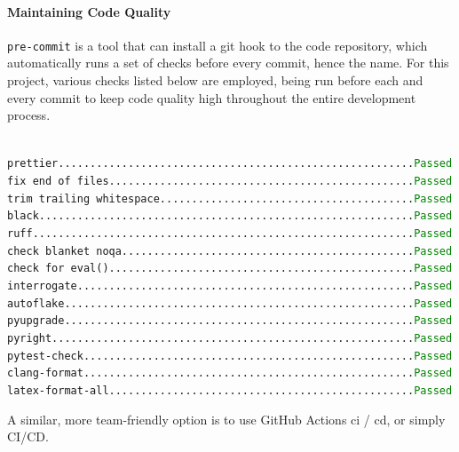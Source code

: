 \documentclass{prettytex/ox/mmsc-special-topic}
\begin{document}
  \paragraph{Maintaining Code Quality}
  \texttt{pre-commit} is a tool that can install a git hook to the code repository, which automatically runs a set of checks before every commit, hence the name.
  For this project, various checks listed below are employed, being run before each and every commit to keep code quality high throughout the entire development process.

  \texttt{
    \hspace*{-1em} prettier........................................................\textcolor{green}{Passed} \\
    fix end of files................................................\textcolor{green}{Passed} \\
    trim trailing whitespace........................................\textcolor{green}{Passed} \\
    black...........................................................\textcolor{green}{Passed} \\
    ruff............................................................\textcolor{green}{Passed} \\
    check blanket noqa..............................................\textcolor{green}{Passed} \\
    check for eval()................................................\textcolor{green}{Passed} \\
    interrogate.....................................................\textcolor{green}{Passed} \\
    autoflake.......................................................\textcolor{green}{Passed} \\
    pyupgrade.......................................................\textcolor{green}{Passed} \\
    pyright.........................................................\textcolor{green}{Passed} \\
    pytest-check....................................................\textcolor{green}{Passed} \\
    clang-format....................................................\textcolor{green}{Passed} \\
    latex-format-all................................................\textcolor{green}{Passed}
  }

  A similar, more team-friendly option is to use GitHub Actions \gls{ci} / \gls{cd}, or simply CI/CD.
\end{document}
